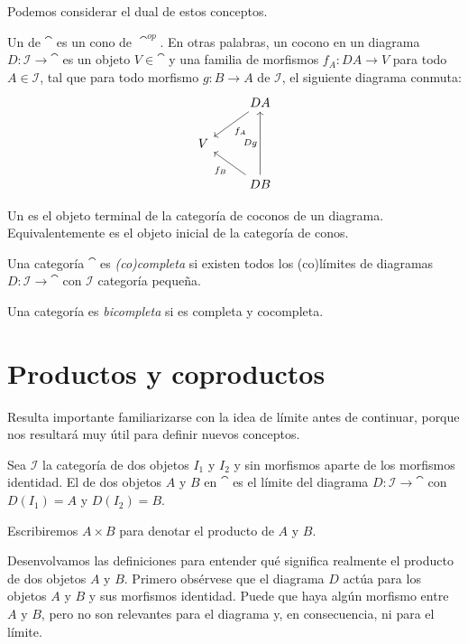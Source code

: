 Podemos considerar el dual de estos conceptos.

\begin{definition}
Un  de $\cat$ es un cono de $\cat^{op}$.
En otras palabras, un cocono en un diagrama $D \colon \mathcal{I} \to \cat$ es un objeto $V \in \cat$ y una familia de morfismos $f_A \colon D A \to V$ para todo $A \in \mathcal{I}$, tal que para todo morfismo $g \colon B \to A$ de $\mathcal{I}$, el siguiente diagrama conmuta:
\[ \begin{tikzcd}
 & D A \arrow[dl,"f_A"]\\
V\\
 & D B \arrow[ul,"f_B"] \arrow[uu,"D g"]
\end{tikzcd} \]
\end{definition}

\begin{definition}
Un  es el objeto terminal de la categoría de coconos de un diagrama. Equivalentemente es el objeto inicial de la categoría de conos.
\end{definition}

\begin{definition}
Una categoría $\cat$ es \emph{(co)completa} si existen todos los (co)límites de diagramas $D \colon \mathcal{I} \to \cat$ con $\mathcal{I}$ categoría pequeña.

Una categoría es \emph{bicompleta} si es completa y cocompleta.
\end{definition}

\section{Productos y coproductos}

Resulta importante familiarizarse con la idea de límite antes de continuar, porque nos resultará muy útil para definir nuevos conceptos.

\begin{definition}
Sea $\mathcal{I}$ la categoría de dos objetos $I_1$ y $I_2$ y sin morfismos aparte de los morfismos identidad. El  de dos objetos $A$ y $B$ en $\cat$ es el límite del diagrama $D \colon \mathcal{I} \to \cat$ con $D(I_1) = A$ y $D(I_2) = B$.

Escribiremos $A \times B$ para denotar el producto de $A$ y $B$.
\end{definition}

Desenvolvamos las definiciones para entender qué significa realmente el producto de dos objetos $A$ y $B$.
Primero obsérvese que el diagrama $D$ actúa para  los objetos $A$ y $B$ y sus morfismos identidad.
Puede que haya algún morfismo entre $A$ y $B$, pero no son relevantes para el diagrama y, en consecuencia, ni para el límite.

